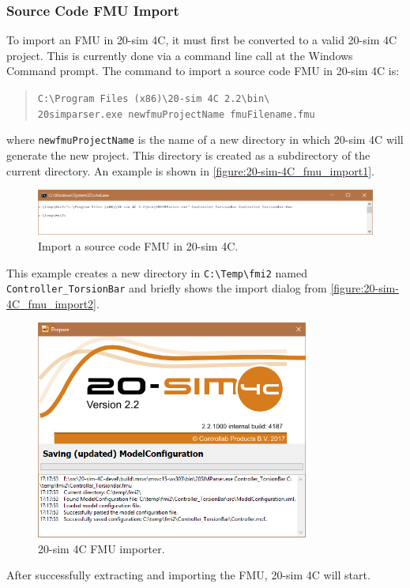 \subsubsection{Source Code FMU Import}\label{sec:simulators:20sim4C:fmuimport}
To import an FMU in {20-sim 4C}, it must first be converted to a valid {20-sim 4C} project.
%
This is currently done via a command line call at the Windows Command prompt.
%
The command to import a source code FMU in {20-sim 4C} is:
%
%
%
\begin{quote}
\texttt{C:\textbackslash{}Program Files (x86)\textbackslash{}20-sim 4C 2.2\textbackslash{}bin\textbackslash{}\\20simparser.exe newfmuProjectName fmuFilename.fmu}\\
\end{quote}
%
%
%
where \texttt{newfmuProjectName} is the name of a new directory in which {20-sim 4C} will generate the new project.
%
This directory is created as a subdirectory of the current directory.
%
An example is shown in \autoref{figure:20-sim-4C_fmu_import1}.
%
%
%
\begin{figure}[hpt]
	\centerline{\includegraphics[width=\textwidth]{figures/20-sim-4C_fmu_import1.png}}
	\caption{Import a source code FMU in 20-sim 4C.}
	\label{figure:20-sim-4C_fmu_import1}
\end{figure}
%
%
%
This example creates a new directory in \texttt{C:\textbackslash{}Temp\textbackslash{}fmi2} named \texttt{Controller\_TorsionBar} and briefly shows the import dialog from \autoref{figure:20-sim-4C_fmu_import2}.
%
%
%
\begin{figure}[hpt]
	\centerline{\includegraphics[width=0.8\textwidth]{figures/20-sim-4C_fmu_import2.png}}
	\caption{20-sim 4C FMU importer.}
	\label{figure:20-sim-4C_fmu_import2}
\end{figure}
%
%
%
After successfully extracting and importing the FMU, 20-sim 4C will start.

